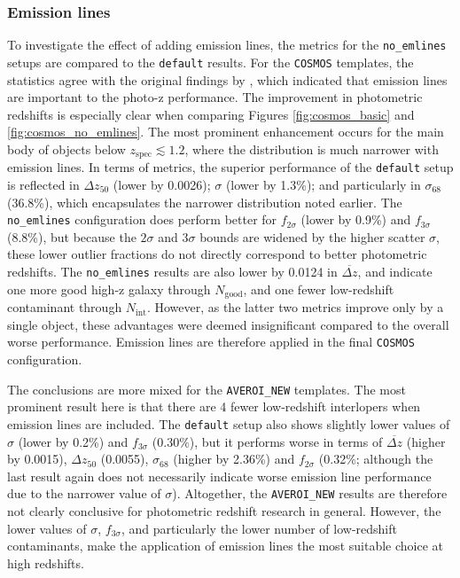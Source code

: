 \subsubsection{Emission lines}\label{subsubsection:discussion_emlines}
To investigate the effect of adding emission lines, the metrics for the \texttt{no\_emlines} setups are compared to the \texttt{default} results. For the \texttt{COSMOS} templates, the statistics agree with the original findings by  \cite{2009ApJ...690.1236I}, which indicated that emission lines are important to the photo-z performance. The improvement in photometric redshifts is especially clear when comparing Figures \ref{fig:cosmos_basic} and \ref{fig:cosmos_no_emlines}. The most prominent enhancement occurs for the main body of objects below $z_{\mathrm{spec}}\lesssim1.2$, where the distribution is much narrower  with emission lines. In terms of metrics, the superior performance of the \texttt{default} setup is reflected in $\Delta z_{50}$ (lower by 0.0026); $\sigma$ (lower by 1.3\%); and particularly in $\sigma_{68}$ (36.8\%), which encapsulates the narrower distribution noted earlier. The \texttt{no\_emlines} configuration does perform better for $f_{2\sigma}$ (lower by 0.9\%) and $f_{3\sigma}$ (8.8\%), but because the $2\sigma$ and $3\sigma$ bounds are widened by the higher scatter $\sigma$, these lower outlier fractions do not directly correspond to better photometric redshifts. The \texttt{no\_emlines} results are also lower by 0.0124 in $\overbar{\Delta z}$, and indicate one more good high-z galaxy through $N_{\mathrm{good}}$, and one fewer low-redshift contaminant through $N_{\mathrm{int}}$. However, as the latter two metrics improve only by a single object, these advantages were deemed insignificant compared to the overall worse performance. Emission lines are therefore applied in the final \texttt{COSMOS} configuration. \par


The conclusions are more mixed for the \texttt{AVEROI\_NEW} templates. The most prominent result here is that there are 4 fewer low-redshift interlopers when emission lines are included. The \texttt{default} setup also shows slightly lower values of $\sigma$ (lower by 0.2\%) and $f_{3\sigma}$ (0.30\%), but it performs worse in terms of $\overbar{\Delta z}$ (higher by 0.0015), $\Delta z_{50}$ (0.0055),  $\sigma_{68}$ (higher by 2.36\%) and $f_{2\sigma}$ (0.32\%; although the last result again does not necessarily indicate worse emission line performance due to the narrower value of $\sigma$). Altogether, the \texttt{AVEROI\_NEW} results are therefore not clearly conclusive for photometric redshift research in general. However, the lower values of $\sigma$, $f_{3\sigma}$, and particularly the lower number of low-redshift contaminants, make the application of emission lines the most suitable choice at high redshifts.\par 



